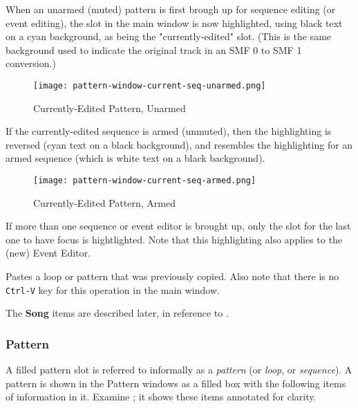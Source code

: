    When an unarmed (muted) pattern is first brough up for sequence editing (or
   event editing), the slot in the main window is now highlighted, using black
   text on a cyan background, as being the "currently-edited" slot.
   (This is the same background used to indicate the original track in an
   SMF 0 to SMF 1 conversion.)

\begin{figure}[H]
   \centering 
   \texttt{[image: pattern-window-current-seq-unarmed.png]}
   \caption{Currently-Edited Pattern, Unarmed}
   \label{fig:pattern_window_current_seq_unarmed}
\end{figure}

   If the currently-edited sequence is armed (unmuted), then the highlighting
   is reversed (cyan text on a black background), and resembles the
   highlighting for an armed sequence (which is white text on a black
   background).

\begin{figure}[H]
   \centering 
   \texttt{[image: pattern-window-current-seq-armed.png]}
   \caption{Currently-Edited Pattern, Armed}
   \label{fig:pattern_window_current_seq_armed}
\end{figure}

   If more than one sequence or event editor is brought up, only the slot for
   the last one to have focus is hightlighted.
   Note that this highlighting also applies to the (new) Event Editor.

   Pastes a loop or pattern that was previously copied.
   Also note that there is no \texttt{Ctrl-V} key for this operation in the
   main window.

   The \textbf{Song} items are described later, in reference to
   .
   
\subsubsection{Pattern}
\label{subsubsec:seq64_patterns_pattern_filled}

   A filled pattern slot is referred to informally as a \textsl{pattern}
   (or \textsl{loop}, or \textsl{sequence}).
   A pattern is shown in the Pattern windows as a filled box with the
   following items of information in it.
   Examine ; it shows
   these items annotated for clarity.

